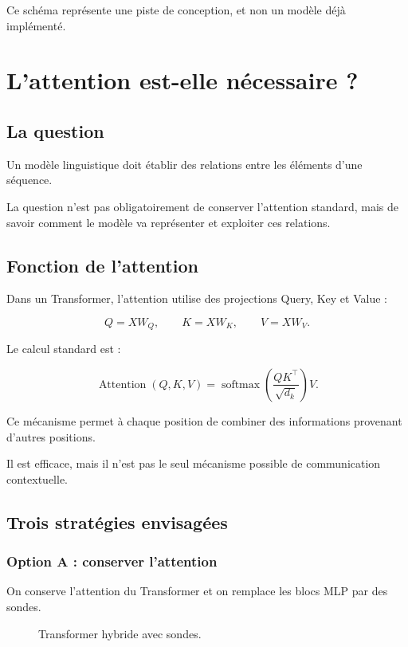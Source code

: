 \documentclass[11pt,a4paper]{report}
\newcommand{\softmax}{\operatorname{softmax}}
\begin{document}
Ce schéma représente une piste de conception, et non
un modèle déjà implémenté.

\chapter{L'attention est-elle nécessaire ?}

\section{La question}

Un modèle linguistique doit établir des relations entre
les éléments d'une séquence.

La question n'est pas obligatoirement de conserver
l'attention standard, mais de savoir comment le modèle
va représenter et exploiter ces relations.

\section{Fonction de l'attention}

Dans un Transformer, l'attention utilise des projections
Query, Key et Value :

\[
Q=XW_Q,\qquad K=XW_K,\qquad V=XW_V.
\]

Le calcul standard est :

\[
\operatorname{Attention}(Q,K,V)
=
\softmax\left(
\frac{QK^\top}{\sqrt{d_k}}
\right)V.
\]

Ce mécanisme permet à chaque position de combiner
des informations provenant d'autres positions.

Il est efficace, mais il n'est pas le seul mécanisme
possible de communication contextuelle.

\section{Trois stratégies envisagées}

\subsection{Option A : conserver l'attention}

On conserve l'attention du Transformer et on remplace
les blocs MLP par des sondes.

\begin{figure}[H]
\centering
{}
\caption{Transformer hybride avec sondes.}
\end{figure}
\end{document}
